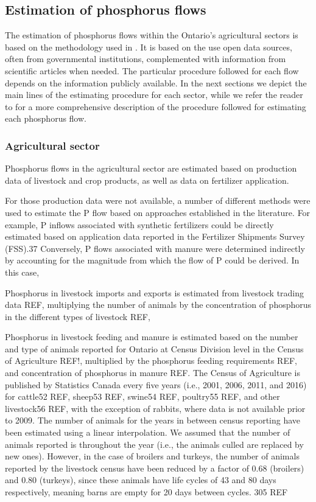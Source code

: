 \documentclass[authoryear]{elsarticle}
\begin{document}
\subsection{Estimation of phosphorus flows}
The estimation of phosphorus flows within the Ontario's agricultural sectors is based on the methodology used in \citet{PFlows_Ontario}. It is based on the use open data sources, often from governmental institutions, complemented with information from scientific articles when needed. The particular procedure followed for each flow depends on the information publicly available. In the next sections we depict the main lines of the estimating procedure for each sector, {\color{red}while we refer the reader to \citet{PFlows_Ontario} for a more comprehensive description of the procedure followed for estimating each phosphorus flow.}

\subsubsection{Agricultural sector} \label{section:AgriSector}
Phosphorus flows in the agricultural sector are estimated based on production data of livestock and crop products, as well as data on fertilizer application.

For those production data were not available, a number of different
methods were used to estimate the P flow based on approaches established in the literature. For example, P inflows
associated with synthetic fertilizers could be directly estimated based on application data reported in the Fertilizer
Shipments Survey (FSS).37 Conversely, 
P flows associated with manure were determined indirectly by accounting for
the magnitude from which the flow of P could be derived. In this case, 

Phosphorus in livestock imports and exports is estimated from livestock trading data REF, multiplying the number of animals by the concentration of phosphorus in the different types of livestock REF,

Phosphorus in livestock feeding and manure
is estimated based on the number and type of animals reported for Ontario at Census Division level in the Census of Agriculture REF!, multiplied by the phosphorus feeding requirements REF, and concentration of phosphorus in manure REF.
The Census of Agriculture is published by Statistics Canada every five years (i.e., 2001, 2006, 2011, and 2016) for cattle52 REF, sheep53 REF, swine54 REF, poultry55 REF, and other livestock56 REF, with the exception of rabbits, where data is not available prior to 2009. The number of animals for the years in between census reporting have been estimated using a linear interpolation. We assumed that the number of animals reported is throughout the year (i.e., the animals culled are replaced by new ones). However, in the case of broilers and turkeys, the number of animals reported by the livestock census have been reduced by a factor of 0.68 (broilers) and 0.80 (turkeys), since these animals have life cycles of 43 and 80 days respectively, meaning barns are empty for 20 days between cycles. 305 REF
\end{document}

